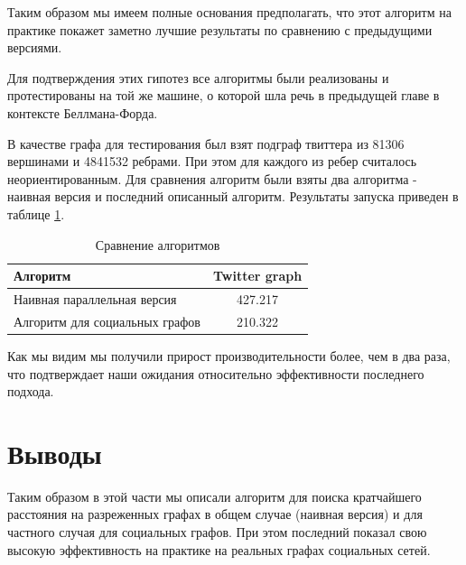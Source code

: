 Таким образом мы имеем полные основания предполагать, что этот алгоритм на практике покажет заметно лучшие результаты по сравнению с предыдущими версиями. 

Для подтверждения этих гипотез все алгоритмы были реализованы и протестированы на той же машине, о которой шла речь в предыдущей главе в контексте Беллмана-Форда.

В качестве графа для тестирования был взят подграф твиттера из 81306 вершинами и 4841532 ребрами. При этом для каждого из ребер считалось неориентированным. Для сравнения алгоритм были взяты два алгоритма - наивная версия и последний описанный алгоритм. Результаты запуска приведен в таблице \ref{table:algo_floyd_comparison}.   


\FloatBarrier
\begin{table}
\centering

\begin{tabular}{l|c}  
Алгоритм & Twitter graph\\
\hline\hline
Наивная параллельная версия & 427.217 \\  
Алгоритм для социальных графов & 210.322  \\
\hline
\end{tabular}

\caption{Сравнение алгоритмов}
\label {table:algo_floyd_comparison}
\end{table}
\FloatBarrier

Как мы видим мы получили прирост производительности более, чем в два раза, что подтверждает наши ожидания относительно эффективности последнего подхода.

\FloatBarrier
\section{Выводы}
Таким образом в этой части мы описали алгоритм для поиска кратчайшего расстояния на разреженных графах в общем случае (наивная версия) и для частного случая для социальных графов. При этом последний показал свою высокую эффективность на практике на реальных графах социальных сетей.
\FloatBarrier
